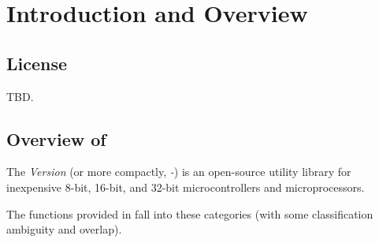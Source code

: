 
\chapter{Introduction and Overview}

\label{ciov0}



\section{License}
\label{ciov0:slic0}

TBD.


\section{Overview of \emph{\productbasenameshort{}}}
\label{ciov0:spov0}

The \emph{\productbasenamelong{} Version \productversion{}}
(or more compactly, 
\emph{\productbasenameshort{}-\productversion{}})
is an
open-source utility library for inexpensive 8-bit, 16-bit, and 32-bit 
microcontrollers and microprocessors.

The functions provided in \emph{\productbasenameshort{}} fall into these categories
(with some classification ambiguity and overlap).

